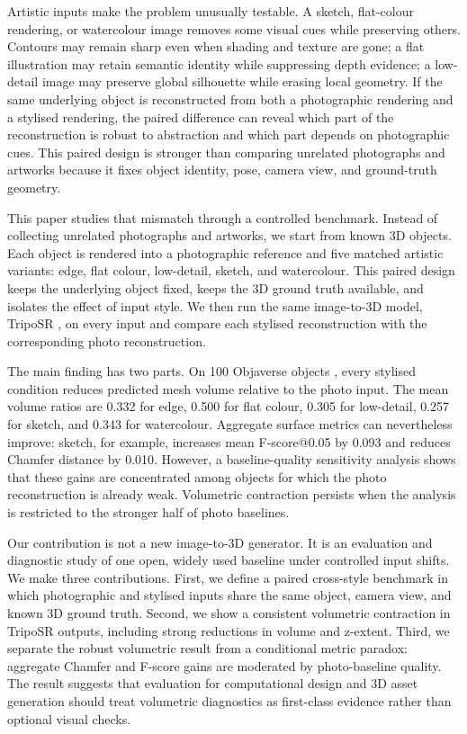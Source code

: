 \documentclass[12pt,a4paper]{article}
\begin{document}
Artistic inputs make the problem unusually testable. A sketch, flat-colour rendering, or watercolour image removes some visual cues while preserving others. Contours may remain sharp even when shading and texture are gone; a flat illustration may retain semantic identity while suppressing depth evidence; a low-detail image may preserve global silhouette while erasing local geometry. If the same underlying object is reconstructed from both a photographic rendering and a stylised rendering, the paired difference can reveal which part of the reconstruction is robust to abstraction and which part depends on photographic cues. This paired design is stronger than comparing unrelated photographs and artworks because it fixes object identity, pose, camera view, and ground-truth geometry.

This paper studies that mismatch through a controlled benchmark. Instead of collecting unrelated photographs and artworks, we start from known 3D objects. Each object is rendered into a photographic reference and five matched artistic variants: edge, flat colour, low-detail, sketch, and watercolour. This paired design keeps the underlying object fixed, keeps the 3D ground truth available, and isolates the effect of input style. We then run the same image-to-3D model, TripoSR \parencite{tochilkin2024triposr}, on every input and compare each stylised reconstruction with the corresponding photo reconstruction.

The main finding has two parts. On 100 Objaverse objects \parencite{deitke2022objaverse}, every stylised condition reduces predicted mesh volume relative to the photo input. The mean volume ratios are 0.332 for edge, 0.500 for flat colour, 0.305 for low-detail, 0.257 for sketch, and 0.343 for watercolour. Aggregate surface metrics can nevertheless improve: sketch, for example, increases mean F-score@0.05 by 0.093 and reduces Chamfer distance by 0.010. However, a baseline-quality sensitivity analysis shows that these gains are concentrated among objects for which the photo reconstruction is already weak. Volumetric contraction persists when the analysis is restricted to the stronger half of photo baselines.

Our contribution is not a new image-to-3D generator. It is an evaluation and diagnostic study of one open, widely used baseline under controlled input shifts. We make three contributions. First, we define a paired cross-style benchmark in which photographic and stylised inputs share the same object, camera view, and known 3D ground truth. Second, we show a consistent volumetric contraction in TripoSR outputs, including strong reductions in volume and z-extent. Third, we separate the robust volumetric result from a conditional metric paradox: aggregate Chamfer and F-score gains are moderated by photo-baseline quality. The result suggests that evaluation for computational design and 3D asset generation should treat volumetric diagnostics as first-class evidence rather than optional visual checks.
\end{document}

